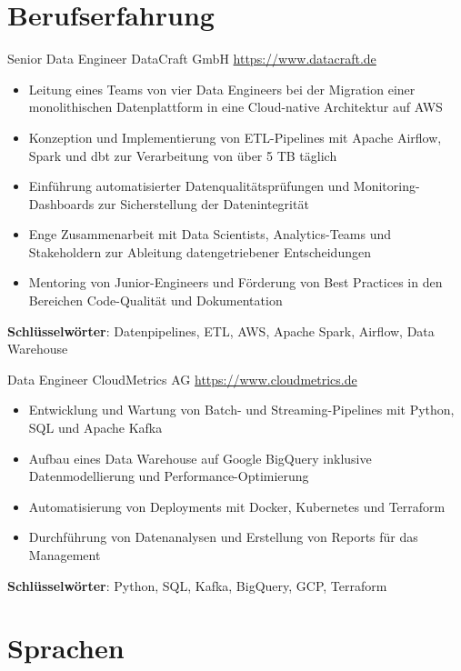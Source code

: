 \documentclass[a4paper, serif, 10pt]{moderncv}
\begin{document}
\section{Berufserfahrung}

        {Senior Data Engineer}
        {DataCraft GmbH}
        {\url{https://www.datacraft.de}}
        {}
        {\begin{itemize}
\item Leitung eines Teams von vier Data Engineers bei der Migration einer monolithischen Datenplattform in eine Cloud-native Architektur auf AWS
\item Konzeption und Implementierung von ETL-Pipelines mit Apache Airflow, Spark und dbt zur Verarbeitung von über 5 TB täglich
\item Einführung automatisierter Datenqualitätsprüfungen und Monitoring-Dashboards zur Sicherstellung der Datenintegrität
\item Enge Zusammenarbeit mit Data Scientists, Analytics-Teams und Stakeholdern zur Ableitung datengetriebener Entscheidungen
\item Mentoring von Junior-Engineers und Förderung von Best Practices in den Bereichen Code-Qualität und Dokumentation
\end{itemize}
\textbf{Schlüsselwörter}: Datenpipelines, ETL, AWS, Apache Spark, Airflow, Data Warehouse}

        {Data Engineer}
        {CloudMetrics AG}
        {\url{https://www.cloudmetrics.de}}
        {}
        {\begin{itemize}
\item Entwicklung und Wartung von Batch- und Streaming-Pipelines mit Python, SQL und Apache Kafka
\item Aufbau eines Data Warehouse auf Google BigQuery inklusive Datenmodellierung und Performance-Optimierung
\item Automatisierung von Deployments mit Docker, Kubernetes und Terraform
\item Durchführung von Datenanalysen und Erstellung von Reports für das Management
\end{itemize}
\textbf{Schlüsselwörter}: Python, SQL, Kafka, BigQuery, GCP, Terraform}
\section{Sprachen}

\end{document}
